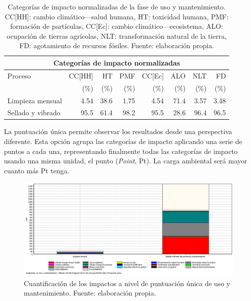 \begin{table}[!htb]
\centering
\begin{tabular}{p{4cm}rrrrrrr}
\toprule
\multicolumn{8}{c}{Categorías de impacto normalizadas}\\
\midrule
Proceso & CC[HH] & HT & PMF & CC[Ec] & ALO & NLT & FD\\
 &  (\%) & (\%) & (\%) & (\%) & (\%) & (\%) & (\%)\\
\midrule
Limpieza mensual & 4.54 & 38.6 & 1.75 & 4.54 & 71.4 & 3.57 & 3.48\\
Sellado y vibrado & 95.5 & 61.4 & 98.2 & 95.5 & 28.6 & 96.4 & 96.5\\
\bottomrule
\end{tabular}
\caption[Categorías de impacto normalizadas de la fase de uso y mantenimiento.]{Categorías de impacto normalizadas de la fase de uso y mantenimiento. CC[HH]: cambio climático—salud humana, HT: toxicidad humana, PMF: formación de partículas, CC[Ec]: cambio climático—ecosistema, ALO: ocupación de tierras agrícolas, NLT: transformación natural de la tierra, FD: agotamiento de recursos fósiles. Fuente: elaboración propia.}
\label{categoriasimpactouso}
\end{table}

La puntuación única permite observar los resultados desde una perspectiva diferente. Esta opción agrupa las categorías de impacto aplicando una serie de puntos a cada una, representando finalmente todas las categorías de impacto usando una misma unidad, el punto (\textit{Point}, Pt). La carga ambiental será mayor cuanto más Pt tenga.

\begin{figure}[!htb]
\centering
\includegraphics[width=15cm]{img/uso_puntuacionunica.png}
\caption[Cuantificación de los impactos a nivel de puntuación única de uso y mantenimiento.]{Cuantificación de los impactos a nivel de puntuación única de uso y mantenimiento. Fuente: elaboración propia.}
\label{fig:uso_puntuacionunica}
\end{figure}

